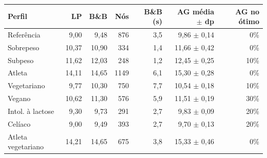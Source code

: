 \begin{tabular}{lrrrrrr}
\toprule
Perfil & LP & B\&B & Nós & B\&B (s) & AG média $\pm$ dp & AG no ótimo \\
\midrule
Referência & 9{,}00 & 9{,}48 & 876 & 3{,}5 & 9{,}86 $\pm$ 0{,}14 & 0\% \\
Sobrepeso & 10{,}37 & 10{,}90 & 334 & 1{,}4 & 11{,}66 $\pm$ 0{,}42 & 0\% \\
Subpeso & 11{,}62 & 12{,}03 & 248 & 1{,}2 & 12{,}45 $\pm$ 0{,}25 & 10\% \\
Atleta & 14{,}11 & 14{,}65 & 1149 & 6{,}1 & 15{,}30 $\pm$ 0{,}28 & 0\% \\
Vegetariano & 9{,}77 & 10{,}30 & 750 & 7{,}7 & 10{,}54 $\pm$ 0{,}18 & 10\% \\
Vegano & 10{,}62 & 11{,}30 & 576 & 5{,}9 & 11{,}51 $\pm$ 0{,}19 & 30\% \\
Intol. à lactose & 9{,}30 & 9{,}73 & 291 & 2{,}7 & 9{,}83 $\pm$ 0{,}09 & 20\% \\
Celíaco & 9{,}00 & 9{,}49 & 393 & 2{,}7 & 9{,}70 $\pm$ 0{,}13 & 20\% \\
Atleta vegetariano & 14{,}21 & 14{,}65 & 675 & 3{,}8 & 15{,}33 $\pm$ 0{,}46 & 0\% \\
\bottomrule
\end{tabular}
